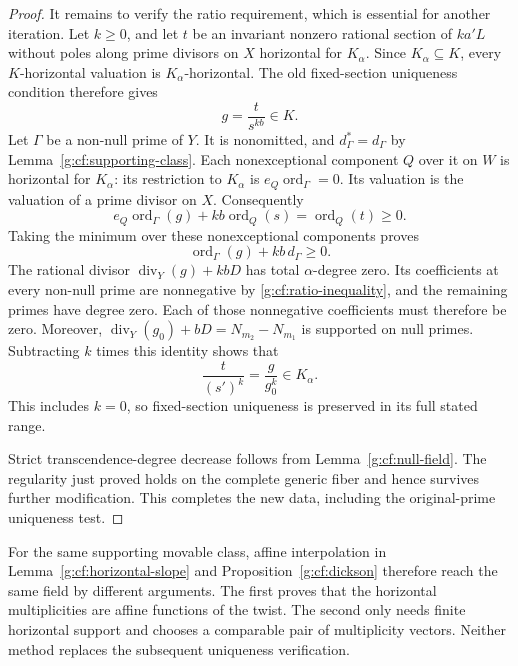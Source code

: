 \begin{proof}
It remains to verify the ratio requirement, which is essential for
another iteration.  Let \(k\geq0\), and let \(t\) be an invariant
nonzero rational section of \(ka'L\) without poles along prime
divisors on \(X\) horizontal for \(K_\alpha\).  Since \(K_\alpha\subseteq K\),
every \(K\)-horizontal valuation is \(K_\alpha\)-horizontal.  The old
fixed-section uniqueness condition therefore gives
\[
                             g=\frac{t}{s^{kb}}\in K.
\]
Let \(\Gamma\) be a non-null prime of \(Y\).  It is nonomitted,
and \(d^*_\Gamma=d_\Gamma\) by
Lemma~\ref{g:cf:supporting-class}.  Each nonexceptional component
\(Q\) over it on \(W\) is horizontal for \(K_\alpha\): its restriction
to \(K_\alpha\) is \(e_Q\operatorname{ord}_\Gamma=0\).  Its valuation
is the valuation of a prime divisor on \(X\).  Consequently
\[
  e_Q\operatorname{ord}_\Gamma(g)+kb\operatorname{ord}_Q(s)
                         =\operatorname{ord}_Q(t)\geq0.
\]
Taking the minimum over these nonexceptional components proves
\begin{equation}\label{g:cf:ratio-inequality}
                   \operatorname{ord}_\Gamma(g)+kb\,d_\Gamma
                   \geq0.
\end{equation}
The rational divisor \(\operatorname{div}_Y(g)+kbD\) has total
\(\alpha\)-degree zero.  Its coefficients at every non-null prime
are nonnegative by \eqref{g:cf:ratio-inequality}, and the remaining
primes have degree zero.  Each of those nonnegative coefficients
must therefore be zero.  Moreover,
\(\operatorname{div}_Y(g_0)+bD=N_{m_2}-N_{m_1}\) is supported on
null primes.  Subtracting \(k\) times this identity shows that
\[
       \frac{t}{(s')^k}=\frac{g}{g_0^k}\in K_\alpha.
\]
This includes \(k=0\), so fixed-section uniqueness is preserved in
its full stated range.


Strict transcendence-degree decrease follows from
Lemma~\ref{g:cf:null-field}. The regularity just proved holds on the
complete generic fiber and hence survives further modification. This
completes the new data, including the original-prime uniqueness test.
\end{proof}

For the same supporting movable class, affine interpolation in
Lemma~\ref{g:cf:horizontal-slope} and
Proposition~\ref{g:cf:dickson} therefore reach the same field by different
arguments. The first proves that the horizontal multiplicities are affine
functions of the twist. The second only needs finite horizontal support
and chooses a comparable pair of multiplicity vectors. Neither method
replaces the subsequent uniqueness verification.


